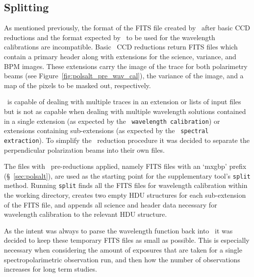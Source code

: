 \subsection{Splitting} \label{subsec:stops_split}



As mentioned previously, the format of the \gls{FITS} file created by \polsalt\ after basic \gls{CCD} reductions and the format expected by \iraf\ to be used for the wavelength calibrations are incompatible. Basic \polsalt\ \gls{CCD} reductions return \gls{FITS} files which contain a primary header along with extensions for the science, variance, and \gls{BPM} images. These extensions carry the image of the trace for both polarimetry beams (see Figure~\ref{fig:polsalt_pre_wav_cal}), the variance of the image, and a map of the pixels to be masked out, respectively.

\iraf\ is capable of dealing with multiple traces in an extension or lists of input files but is not as capable when dealing with multiple wavelength solutions contained in a single extension (as expected by the \polsalt\ \texttt{wavelength calibration}) or extensions containing sub-extensions (as expected by the \polsalt\ \texttt{spectral extraction}). To simplify the \iraf\ reduction procedure it was decided to separate the perpendicular polarization beams into their own files.

The files with \polsalt\ pre-reductions applied, namely \gls{FITS} files with an `mxgbp' prefix (\S~\ref{sec:polsalt}), are used as the starting point for the supplementary tool's \texttt{split} method. Running \texttt{split} finds all the \gls{FITS} files for wavelength calibration within the working directory, creates two empty \gls{HDU} structures for each sub-extension of the \gls{FITS} file, and appends all science and header data necessary for wavelength calibration to the relevant \gls{HDU} structure.

As the intent was always to parse the wavelength function back into \polsalt\ it was decided to keep these temporary \gls{FITS} files as small as possible. This is especially necessary when considering the amount of exposures that are taken for a single spectropolarimetric observation run, and then how the number of observations increases for long term studies.

